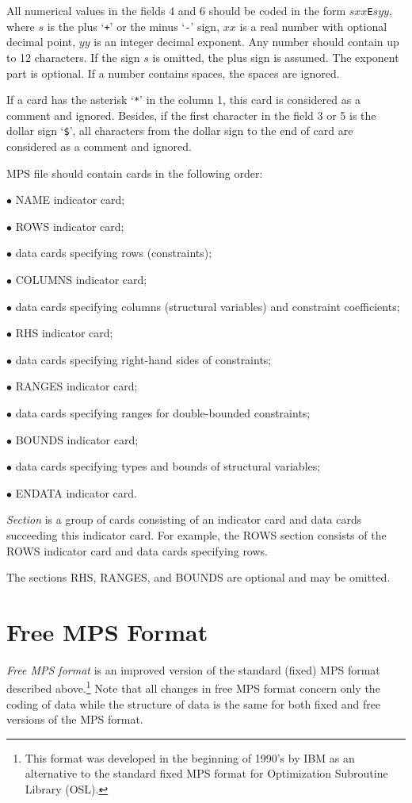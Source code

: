 All numerical values in the fields 4 and 6 should be coded in the form
$sxx$\verb|E|$syy$, where $s$ is the plus `\verb|+|' or the minus
`\verb|-|' sign, $xx$ is a real number with optional decimal point,
$yy$ is an integer decimal exponent. Any number should contain up to 12
characters. If the sign $s$ is omitted, the plus sign is assumed. The
exponent part is optional. If a number contains spaces, the spaces are
ignored.

If a card has the asterisk `\verb|*|' in the column 1, this card is
considered as a comment and ignored. Besides, if the first character in
the field 3 or 5 is the dollar sign `\verb|$|', all characters from the
dollar sign to the end of card are considered as a comment and ignored.

MPS file should contain cards in the following order:

$\bullet$ NAME indicator card;

$\bullet$ ROWS indicator card;

$\bullet$ data cards specifying rows (constraints);

$\bullet$ COLUMNS indicator card;

$\bullet$ data cards specifying columns (structural variables) and
constraint coefficients;

$\bullet$ RHS indicator card;

$\bullet$ data cards specifying right-hand sides of constraints;

$\bullet$ RANGES indicator card;

$\bullet$ data cards specifying ranges for double-bounded constraints;

$\bullet$ BOUNDS indicator card;

$\bullet$ data cards specifying types and bounds of structural
variables;

$\bullet$ ENDATA indicator card.

{\it Section} is a group of cards consisting of an indicator card and
data cards succeeding this indicator card. For example, the ROWS section
consists of the ROWS indicator card and data cards specifying rows.

The sections RHS, RANGES, and BOUNDS are optional and may be omitted.

\section{Free MPS Format}

{\it Free MPS format} is an improved version of the standard (fixed)
MPS format described above.\footnote{This format was developed in the
beginning of 1990's by IBM as an alternative to the standard fixed MPS
format for Optimization Subroutine Library (OSL).} Note that all
changes in free MPS format concern only the coding of data while the
structure of data is the same for both fixed and free versions of the
MPS format.


